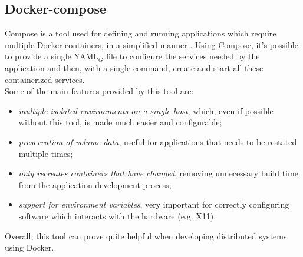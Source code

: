 \subsection{Docker-compose}\label{docker-compose}
Compose is a tool used for defining and running applications which require multiple Docker containers, in a simplified manner \cite{site:docker-compose-doc}. Using Compose, it's possible to provide a single YAML$_G$ file to configure the services needed by the application and then, with a single command, create and start all these containerized services. \\
Some of the main features provided by this tool are:
\begin{itemize}
	\item \textit{multiple isolated environments on a single host}, which, even if possible without this tool, is made much easier and configurable;
	\item \textit{preservation of volume data}, useful for applications that needs to be restated multiple times;
	\item \textit{only recreates containers that have changed}, removing unnecessary build time from the application development process;
	\item \textit{support for environment variables}, very important for correctly configuring software which interacts with the hardware (e.g. X11).
\end{itemize}
Overall, this tool can prove quite helpful when developing distributed systems using Docker.

